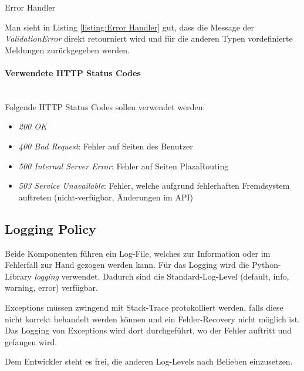 \begin{listing}[ht]
    \inputminted{python}{projectdoc/listing/flask_error_handler.py}
    \caption{Error Handler}
    \label{listing:Error Handler}
\end{listing}

Man sieht in Listing \ref{listing:Error Handler} gut, dass die Message der \emph{ValidationError} direkt retourniert wird und für die anderen Typen vordefinierte Meldungen zurückgegeben werden.


\paragraph{Verwendete HTTP Status Codes}\label{ehp:Verwendete HTTP Status Codes}~\\
Folgende HTTP Status Codes sollen verwendet werden:
\begin{itemize}
    \item \emph{200 OK}
    \item \emph{400 Bad Request}: Fehler auf Seiten des Benutzer
    \item \emph{500 Internal Server Error}: Fehler auf Seiten PlazaRouting
    \item \emph{503 Service Unavailable}: Fehler, welche aufgrund fehlerhaften Fremdsystem auftreten (nicht-verfügbar, Änderungen im API)
\end{itemize}


\subsection{Logging Policy}
\label{ehp:Logging Policy}
Beide Komponenten führen ein Log-File, welches zur Information oder im Fehlerfall zur Hand gezogen werden kann. Für das Logging wird die Python-Library \emph{logging} verwendet. Dadurch sind die Standard-Log-Level (default, info, warning, error) verfügbar.

Exceptions müssen zwingend mit Stack-Trace protokolliert werden, falls diese nicht korrekt behandelt werden können und ein Fehler-Recovery nicht möglich ist. Das Logging von Exceptions wird dort durchgeführt, wo der Fehler auftritt und gefangen wird.

Dem Entwickler steht es frei, die anderen Log-Levels nach Belieben einzusetzen.
